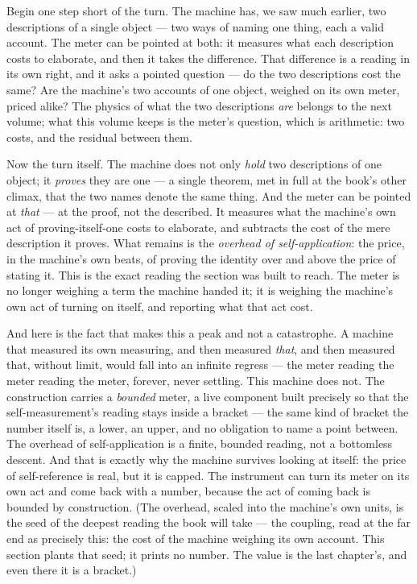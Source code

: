 Begin one step short of the turn. The machine has, we saw much earlier, two descriptions of a single object --- two
ways of naming one thing, each a valid account. The meter can be pointed at both: it measures what each description
costs to elaborate, and then it takes the difference. That difference is a reading in its own right, and it asks a
pointed question --- do the two descriptions cost the same? Are the machine's two accounts of one object, weighed on
its own meter, priced alike? The physics of what the two descriptions \emph{are} belongs to the next volume; what this
volume keeps is the meter's question, which is arithmetic: two costs, and the residual between them.

Now the turn itself. The machine does not only \emph{hold} two descriptions of one object; it \emph{proves} they are
one --- a single theorem, met in full at the book's other climax, that the two names denote the same thing. And the
meter can be pointed at \emph{that} --- at the proof, not the described. It measures what the machine's own act of
proving-itself-one costs to elaborate, and subtracts the cost of the mere description it proves. What remains is the
\emph{overhead of self-application}: the price, in the machine's own beats, of proving the identity over and above the
price of stating it. This is the exact reading the section was built to reach. The meter is no longer weighing a term
the machine handed it; it is weighing the machine's own act of turning on itself, and reporting what that act cost.

And here is the fact that makes this a peak and not a catastrophe. A machine that measured its own measuring, and then
measured \emph{that}, and then measured that, without limit, would fall into an infinite regress --- the meter reading
the meter reading the meter, forever, never settling. This machine does not. The construction carries a \emph{bounded}
meter, a live component built precisely so that the self-measurement's reading stays inside a bracket --- the same kind
of bracket the number itself is, a lower, an upper, and no obligation to name a point between. The overhead of
self-application is a finite, bounded reading, not a bottomless descent. And that is exactly why the machine survives
looking at itself: the price of self-reference is real, but it is capped. The instrument can turn its meter on its own
act and come back with a number, because the act of coming back is bounded by construction. (The overhead, scaled into
the machine's own units, is the seed of the deepest reading the book will take --- the coupling, read at the far end as
precisely this: the cost of the machine weighing its own account. This section plants that seed; it prints no number.
The value is the last chapter's, and even there it is a bracket.)

